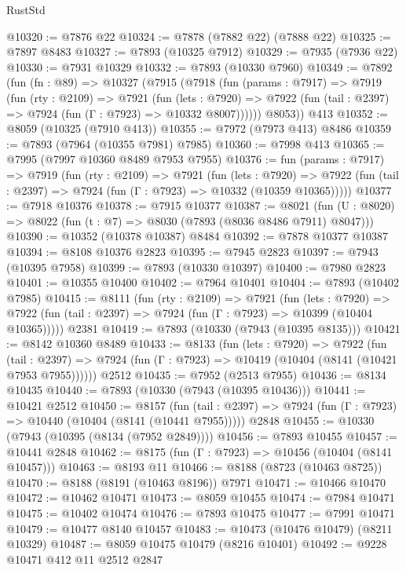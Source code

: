 \begin{lexlean}{RustStd}
\begin{coremodule}
@10320 := @7876 @22
@10324 := @7878 (@7882 @22) (@7888 @22)
@10325 := @7897 @8483
@10327 := @7893 (@10325 @7912)
@10329 := @7935 (@7936 @22)
@10330 := @7931 @10329
@10332 := @7893 (@10330 @7960)
@10349 := @7892
    (fun (fn : @89) =>
    @10327
      (@7915
        (@7918
          (fun (params : @7917) =>
          @7919
            (fun (rty : @2109) =>
            @7921
              (fun (lets : @7920) =>
              @7922 (fun (tail : @2397) => @7924 (fun (Γ : @7923) => @10332 @8007))))))
        @8053))
    @413
@10352 := @8059 (@10325 (@7910 @413))
@10355 := @7972 (@7973 @413) @8486
@10359 := @7893 (@7964 (@10355 @7981) @7985)
@10360 := @7998 @413
@10365 := @7995 (@7997 @10360 @8489 @7953 @7955)
@10376 := fun (params : @7917) =>
  @7919
    (fun (rty : @2109) =>
    @7921
      (fun (lets : @7920) =>
      @7922 (fun (tail : @2397) => @7924 (fun (Γ : @7923) => @10332 (@10359 @10365)))))
@10377 := @7918 @10376
@10378 := @7915 @10377
@10387 := @8021 (fun (U : @8020) => @8022 (fun (t : @7) => @8030 (@7893 (@8036 @8486 @7911) @8047)))
@10390 := @10352 (@10378 @10387) @8484
@10392 := @7878 @10377 @10387
@10394 := @8108 @10376 @2823
@10395 := @7945 @2823
@10397 := @7943 (@10395 @7958)
@10399 := @7893 (@10330 @10397)
@10400 := @7980 @2823
@10401 := @10355 @10400
@10402 := @7964 @10401
@10404 := @7893 (@10402 @7985)
@10415 := @8111
    (fun (rty : @2109) =>
    @7921
      (fun (lets : @7920) =>
      @7922 (fun (tail : @2397) => @7924 (fun (Γ : @7923) => @10399 (@10404 @10365)))))
    @2381
@10419 := @7893 (@10330 (@7943 (@10395 @8135)))
@10421 := @8142 @10360 @8489
@10433 := @8133
    (fun (lets : @7920) =>
    @7922
      (fun (tail : @2397) =>
      @7924 (fun (Γ : @7923) => @10419 (@10404 (@8141 (@10421 @7953 @7955))))))
    @2512
@10435 := @7952 (@2513 @7955)
@10436 := @8134 @10435
@10440 := @7893 (@10330 (@7943 (@10395 @10436)))
@10441 := @10421 @2512
@10450 := @8157
    (fun (tail : @2397) => @7924 (fun (Γ : @7923) => @10440 (@10404 (@8141 (@10441 @7955)))))
    @2848
@10455 := @10330 (@7943 (@10395 (@8134 (@7952 @2849))))
@10456 := @7893 @10455
@10457 := @10441 @2848
@10462 := @8175 (fun (Γ : @7923) => @10456 (@10404 (@8141 @10457)))
@10463 := @8193 @11
@10466 := @8188 (@8723 (@10463 @8725))
@10470 := @8188 (@8191 (@10463 @8196)) @7971
@10471 := @10466 @10470
@10472 := @10462 @10471
@10473 := @8059 @10455
@10474 := @7984 @10471
@10475 := @10402 @10474
@10476 := @7893 @10475
@10477 := @7991 @10471
@10479 := @10477 @8140 @10457
@10483 := @10473 (@10476 @10479) (@8211 @10329)
@10487 := @8059 @10475 @10479 (@8216 @10401)
@10492 := @9228 @10471 @412 @11 @2512 @2847

\end{coremodule}
\end{lexlean}
